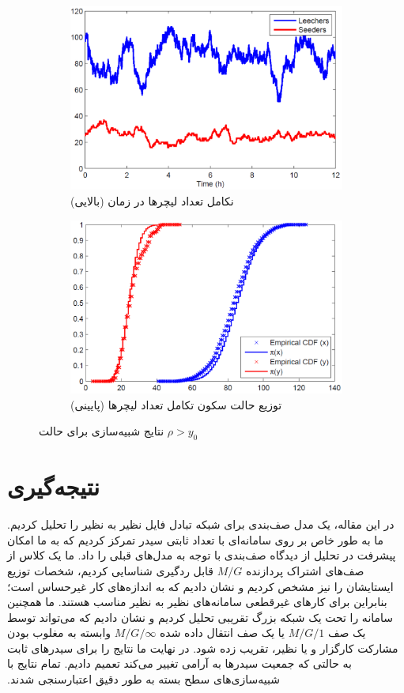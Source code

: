 \documentclass[11pt, oneside]{article}
\begin{document}
\begin{figure}[!ht]
	\centering
	\begin{subfigure}[b]{0.5\columnwidth}
		\centering
		\includegraphics[width=0.8\columnwidth]{resources/fig4_a.png}
		\caption{نکامل تعداد لیچرها در زمان (بالایی)}
	\end{subfigure}\hfill
	\begin{subfigure}[b]{0.5\columnwidth}
		\centering
		\includegraphics[width=0.8\columnwidth]{resources/fig4_b.png}
		\caption{توزیع حالت سکون تکامل تعداد لیچرها (پایینی)}
	\end{subfigure}
	\caption{نتایج شبیه‌سازی برای حالت $\rho>y_0$}
\end{figure}



\section{نتیجه‌گیری}

‫در این مقاله، یک مدل صف‌بندی برای شبکه تبادل فایل نظیر به نظیر را تحلیل کردیم. ما به طور خاص بر روی سامانه‌ای با تعداد ثابتی سیدر تمرکز کردیم که به ما امکان پیشرفت در تحلیل از دیدگاه صف‌بندی با توجه به مدل‌های قبلی را داد. ما یک کلاس از صف‌های اشتراک پردازنده $M/G$‌ قابل ردگیری  شناسایی کردیم، شخصات توزیع ایستایشان را نیز مشخص کردیم و نشان دادیم که به اندازه‌های کار غیرحساس است؛ بنابراین برای کارهای غیرقطعی سامانه‌های نظیر به نظیر مناسب هستند. ما همچنین سامانه را تحت یک شبکه بزرگ تقریبی تحلیل کردیم و نشان دادیم که می‌تواند توسط یک صف $M/G/1$ یا یک صف انتقال داده شده $M/G/\infty$ وابسته به مغلوب بودن مشارکت کارگزار و یا نظیر، تقریب زده شود. در نهایت ما نتایج را برای سیدرهای ثابت به حالتی که جمعیت سیدرها به آرامی تغییر می‌کند تعمیم دادیم. تمام نتایج با شبیه‌سازی‌های سطح بسته به طور دقیق اعتبارسنجی شدند.


\linespread{1.0}
\latinfont


\printendnotes[custom]
\end{document}
